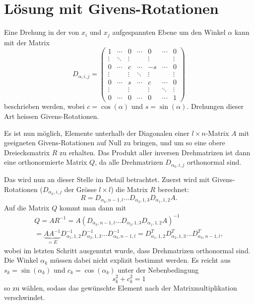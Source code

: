 %
%
%
\section{Lösung mit Givens-Rotationen
\label{qr:section:loesung}}
Eine Drehung in der von $x_i$ und $x_j$ aufgespannten Ebene um den Winkel $\alpha$ kann mit der Matrix
\begin{equation}
D_{\alpha,i,j}=
\begin{pmatrix}
1     &\cdots&0     &\cdots&0     &\cdots&0\\
\vdots&\ddots&\vdots&      &\vdots&      &\vdots\\
0     &\cdots&c     &\cdots&-s    &\cdots&0\\
\vdots&      &\vdots&\ddots&\vdots&      &\vdots\\
0     &\cdots&s     &\cdots&c     &\cdots&0\\
\vdots&      &\vdots&      &\vdots&\ddots&\vdots\\
0     &\cdots&0     &\cdots&0     &\cdots&1
\end{pmatrix}
\end{equation}
beschrieben werden, wobei $c=\cos(\alpha)$ und $s=\sin(\alpha)$.
Drehungen dieser Art heissen Givens-Rotationen.

Es ist nun möglich, Elemente unterhalb der Diagonalen einer $l\times n $-Matrix $A$ mit geeigneten Givens-Rotationen auf Null zu bringen, und um so eine obere Dreiecksmatrix $R$ zu erhalten.
Das Produkt aller inversen Drehmatrizen ist dann eine orthonormierte Matrix $Q$, da alle Drehmatrizen $D_{\alpha_k,i,j}$ orthonormal sind.

Das wird nun an dieser Stelle im Detail betrachtet.
Zuerst wird mit Givens-Rotationen ($D_{\alpha_k, i, j}$ der Grösse $l\times l$) die Matrix $R$ berechnet: 
\begin{equation*}
R = D_{\alpha_k,n-1,l}...D_{\alpha_2,1,3}D_{\alpha_1,1,2}A.		
\end{equation*}
Auf die Matrix $Q$ kommt man dann mit
\begin{multline*}
Q=AR^{-1}=A(D_{\alpha_k,n-1,l}...D_{\alpha_2,1,3}D_{\alpha_1,1,2}A)^{-1}\\=
\underbrace{AA^{-1}}_{\displaystyle=E}D_{\alpha_1,1,2}^{-1}D_{\alpha_2,1,3}^{-1}... D_{\alpha_k, n-1,l}^{-1}=
D_{\alpha_1,1,2}^{T}D_{\alpha_2,1,3}^{T}...D_{\alpha_k, n-1,l}^{T},
\end{multline*}
wobei im letzten Schritt ausgenutzt wurde, dass Drehmatrizen orthonormal sind.
Die Winkel $\alpha_k$ müssen dabei nicht explizit bestimmt werden.
Es reicht aus $s_k = \sin(\alpha_k)$ und $c_k=\cos(\alpha_k)$ unter der Nebenbedingung
\begin{equation*}
s_k^2+c_k^2 = 1
\end{equation*}
so zu wählen, sodass das gewünschte Element nach der Matrixmultiplikation verschwindet.

